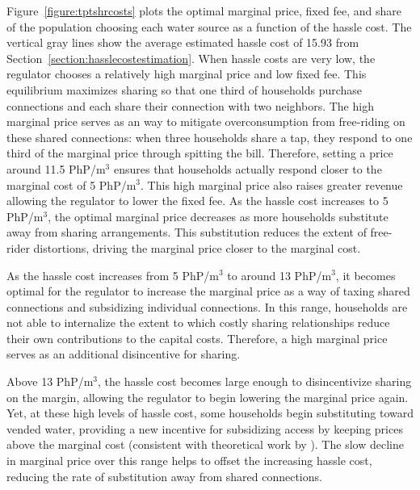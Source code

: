 \documentclass[12pt]{article}
\begin{document}
Figure~\ref{figure:tptshrcosts} plots the optimal marginal price, fixed fee, and share of the population choosing each water source as a function of the hassle cost.  The vertical gray lines show the average estimated hassle cost of 15.93 from Section~\ref{section:hasslecostestimation}.  When hassle costs are very low, the regulator chooses a relatively high marginal price and low fixed fee.  This equilibrium maximizes sharing so that one third of households purchase connections and each share their connection with two neighbors.  The high marginal price serves as an way to mitigate overconsumption from free-riding on these shared connections: when three households share a tap, they respond to one third of the marginal price through spitting the bill.  Therefore, setting a price around 11.5 PhP/$\text{m}^3$ ensures that households actually respond closer to the marginal cost of 5 PhP/$\text{m}^3$.  This high marginal price also raises greater revenue allowing the regulator to lower the fixed fee.  As the hassle cost increases to 5 PhP/$\text{m}^3$, the optimal marginal price decreases as more households substitute away from sharing arrangements.  This substitution reduces the extent of free-rider distortions, driving the marginal price closer to the marginal cost.

As the hassle cost increases from 5 PhP/$\text{m}^3$ to around 13 PhP/$\text{m}^3$, it becomes optimal for the regulator to increase the marginal price as a way of taxing shared connections and subsidizing individual connections.  In this range, households are not able to internalize the extent to which costly sharing relationships reduce their own contributions to the capital costs.  Therefore, a high marginal price serves as an additional disincentive for sharing.

Above 13 PhP/$\text{m}^3$, the hassle cost becomes large enough to disincentivize sharing on the margin, allowing the regulator to begin lowering the marginal price again.  Yet, at these high levels of hassle cost, some households begin substituting toward vended water, providing a new incentive for subsidizing access by keeping prices above the marginal cost (consistent with theoretical work by \cite{auerbach1978two}).  The slow decline in marginal price over this range helps to offset the increasing hassle cost, reducing the rate of substitution away from shared connections.  
\end{document}
